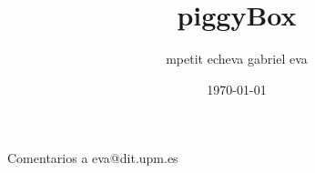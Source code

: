 \renewcommand{\encodingdefault}{T1}

\title{piggyBox}
\author{mpetit echeva gabriel eva}
\date{\today}




\maketitle


Comentarios a eva@dit.upm.es















\newpage
\tableofcontents


